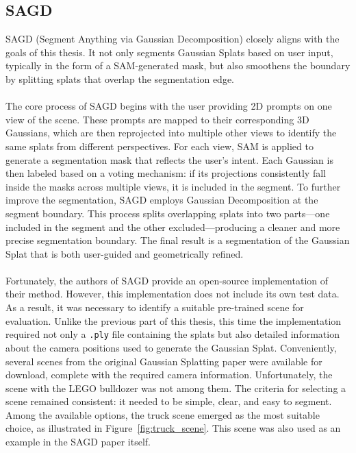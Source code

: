 \documentclass[12pt]{article}
\begin{document}
\subsection{SAGD}
SAGD (Segment Anything via Gaussian Decomposition) closely aligns with the goals of this thesis. It not only segments Gaussian Splats based on user input, typically in the form of a SAM-generated mask, but also smoothens the boundary by splitting splats that overlap the segmentation edge.
\\\\
The core process of SAGD begins with the user providing 2D prompts on one view of the scene. These prompts are mapped to their corresponding 3D Gaussians, which are then reprojected into multiple other views to identify the same splats from different perspectives. For each view, SAM is applied to generate a segmentation mask that reflects the user’s intent. Each Gaussian is then labeled based on a voting mechanism: if its projections consistently fall inside the masks across multiple views, it is included in the segment. To further improve the segmentation, SAGD employs Gaussian Decomposition at the segment boundary. This process splits overlapping splats into two parts—one included in the segment and the other excluded—producing a cleaner and more precise segmentation boundary. The final result is a segmentation of the Gaussian Splat that is both user-guided and geometrically refined.
\\\\
Fortunately, the authors of SAGD provide an open-source implementation of their method. However, this implementation does not include its own test data. As a result, it was necessary to identify a suitable pre-trained scene for evaluation. Unlike the previous part of this thesis, this time the implementation required not only a \texttt{.ply} file containing the splats but also detailed information about the camera positions used to generate the Gaussian Splat. Conveniently, several scenes from the original Gaussian Splatting paper were available for download, complete with the required camera information. Unfortunately, the scene with the LEGO bulldozer was not among them. The criteria for selecting a scene remained consistent: it needed to be simple, clear, and easy to segment. Among the available options, the truck scene emerged as the most suitable choice, as illustrated in Figure~\ref{fig:truck_scene}. This scene was also used as an example in the SAGD paper itself.
\end{document}
